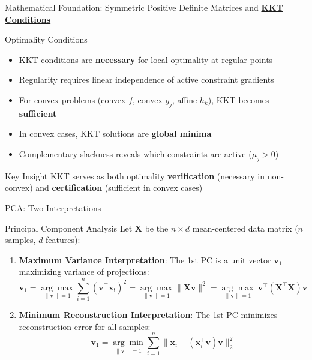 \documentclass{beamer}
\begin{document}
\begin{frame}{{Mathematical Foundation: Symmetric Positive Definite Matrices and \textbf{\underline{KKT Conditions}}}}
    \begin{block}{Optimality Conditions}
        \begin{itemize}
            \item KKT conditions are \textbf{necessary} for local optimality at regular points
            \item Regularity requires linear independence of active constraint gradients
            \item For convex problems (convex $f$, convex $g_j$, affine $h_k$), KKT becomes \textbf{sufficient}
            \item In convex cases, KKT solutions are \textbf{global minima}
            \item Complementary slackness reveals which constraints are active ($\mu_j > 0$)
        \end{itemize}
    \end{block}

    \begin{alertblock}{Key Insight}
        KKT serves as both optimality \textbf{verification} (necessary in non-convex) and \textbf{certification} (sufficient in convex cases)
    \end{alertblock}
\end{frame}


\begin{frame}{PCA: Two Interpretations}
    \begin{block}{Principal Component Analysis}
        Let $\mathbf{X}$ be the $n \times d$ mean-centered data matrix ($n$ samples, $d$ features):
        
        \begin{enumerate}
            \item \textbf{Maximum Variance Interpretation}:
            The 1st PC is a unit vector $\mathbf{v}_1$ maximizing variance of projections:
            \[
             \mathbf{v}_1 = \underset{\|\mathbf{v}\|=1}{\arg\max} \sum_{i = 1}^n (\mathbf{v}^\top \mathbf{x_i})^2 =  \underset{\|\mathbf{v}\|=1}{\arg\max} \|\mathbf{X}\mathbf{v}\|^2 = \underset{\|\mathbf{v}\|=1}{\arg\max}\ \mathbf{v}^\top (\mathbf{X}^\top \mathbf{X}) \mathbf{v}
            \]
            
            \item \textbf{Minimum Reconstruction Interpretation}:
            The 1st PC minimizes reconstruction error for all samples:
            \[
            \mathbf{v}_1 = \underset{\|\mathbf{v}\|=1}{\arg\min} \sum_{i=1}^n \|\mathbf{x}_i - (\mathbf{x}_i^\top \mathbf{v})\mathbf{v}\|_2^2
            \]
        \end{enumerate}
    \end{block}
\end{frame}
\end{document}
